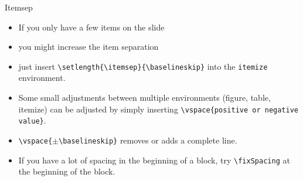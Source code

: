 \begin{frame}{Itemsep}

\begin{itemize}
	\setlength{\itemsep}{\baselineskip}
	\item If you only have a few items on the slide
	\item you might increase the item separation
	\item just insert \texttt{\textbackslash setlength\{\textbackslash itemsep\}\{\textbackslash baselineskip\}} into the \texttt{itemize} environment.
	\item Some small adjustments between multiple environments (figure, table, itemize) can be adjusted by simply inserting \texttt{\textbackslash vspace\{positive or negative value\}}.
	\item \texttt{\textbackslash vspace\{$\pm$\textbackslash baselineskip\}} removes or adds a complete line.
	\item If you have a lot of spacing in the beginning of a block, try \texttt{\textbackslash fixSpacing} at the beginning of the block.
\end{itemize}

\end{frame}
